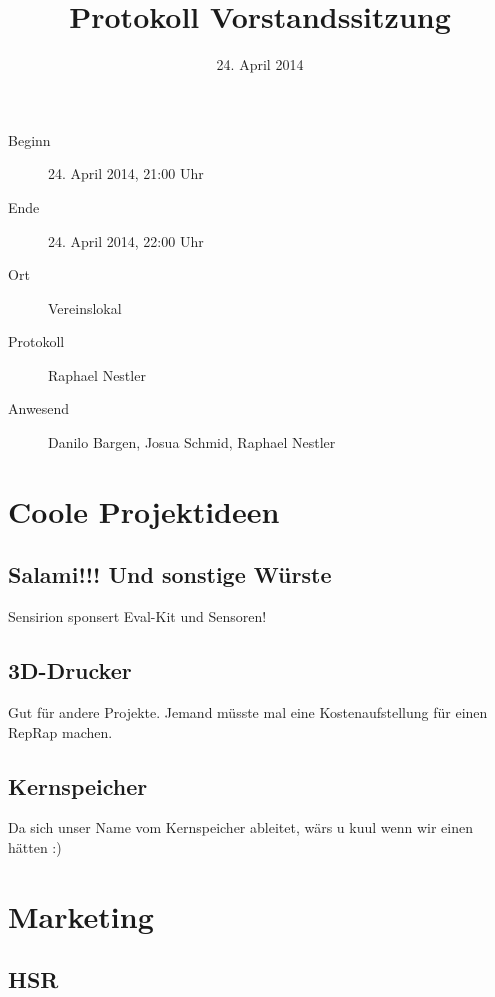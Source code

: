 \documentclass[10pt,a4paper,parskip,fleqn]{scrartcl}
\title{Protokoll Vorstandssitzung}
\date{24. April 2014}
\begin{document}
\begin{titlepage}

	\maketitle
	\thispagestyle{empty} %

	\vfill

	\begin{description}
		\item[Beginn] 24. April 2014, 21:00 Uhr
		\item[Ende] 24. April 2014, 22:00 Uhr
		\item[Ort] Vereinslokal
		\item[Protokoll] Raphael Nestler
		\item[Anwesend] Danilo Bargen, Josua Schmid, Raphael Nestler
	\end{description}

\end{titlepage}


\section{Coole Projektideen}

\subsection{Salami!!! Und sonstige Würste}

Sensirion sponsert Eval-Kit und Sensoren!

\subsection{3D-Drucker}

Gut für andere Projekte. Jemand müsste mal eine Kostenaufstellung für
einen RepRap machen.

\subsection{Kernspeicher}

Da sich unser Name vom Kernspeicher ableitet, wärs u kuul wenn wir einen hätten :)


\section{Marketing}

\subsection{HSR}
\end{document}
